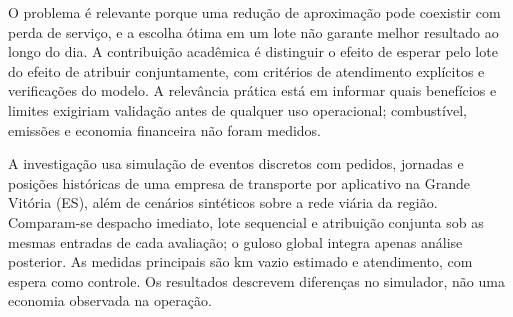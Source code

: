 O problema é relevante porque uma redução de aproximação pode coexistir com perda de serviço, e a escolha ótima em um lote não garante melhor resultado ao longo do dia. A contribuição acadêmica é distinguir o efeito de esperar pelo lote do efeito de atribuir conjuntamente, com critérios de atendimento explícitos e verificações do modelo. A relevância prática está em informar quais benefícios e limites exigiriam validação antes de qualquer uso operacional; combustível, emissões e economia financeira não foram medidos.

A investigação usa simulação de eventos discretos com pedidos, jornadas e posições históricas de uma empresa de transporte por aplicativo na Grande Vitória (ES), além de cenários sintéticos sobre a rede viária da região. Comparam-se despacho imediato, lote sequencial e atribuição conjunta sob as mesmas entradas de cada avaliação; o guloso global integra apenas análise posterior. As medidas principais são km vazio estimado e atendimento, com espera como controle. Os resultados descrevem diferenças no simulador, não uma economia observada na operação.
